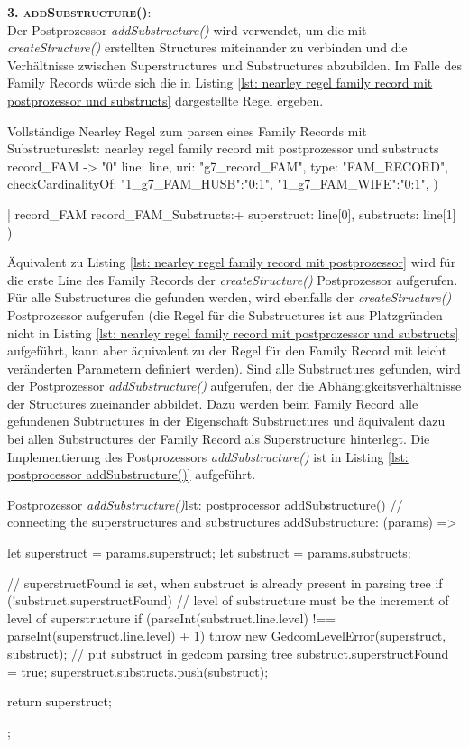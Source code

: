 \textsc{\textbf{3. addSubstructure()}:} \vspace{0.5em} \\
Der Postprozessor \textit{addSubstructure()} wird verwendet, um die mit \textit{createStructure()} erstellten Structures miteinander zu verbinden und die Verhältnisse zwischen Superstructures und Substructures abzubilden. Im Falle des Family Records würde sich die in Listing \ref{lst: nearley regel family record mit postprozessor und substructs} dargestellte Regel ergeben. 
\vspace{1em}
\begin{javascript}{Vollständige Nearley Regel zum parsen eines Family Records mit Substructures}{lst: nearley regel family record mit postprozessor und substructs}
	record_FAM
		-> "0"  %
			{%
					line: line,
					uri: "g7_record_FAM", 
					type: "FAM_RECORD", 
					checkCardinalityOf: {
						"1_g7_FAM_HUSB":"0:1", 
						"1_g7_FAM_WIFE":"0:1",
					}
				}) 
		
		|  record_FAM  record_FAM_Substructs:+
			{%
					superstruct: line[0], 
					substructs: line[1]
				})
\end{javascript}
\vspace{1em}
Äquivalent zu Listing \ref{lst: nearley regel family record mit postprozessor} wird für die erste Line des Family Records der \textit{createStructure()} Postprozessor aufgerufen. Für alle Substructures die gefunden werden, wird ebenfalls der \textit{createStructure()} Postprozessor aufgerufen (die Regel für die Substructures ist aus Platzgründen nicht in Listing \ref{lst: nearley regel family record mit postprozessor und substructs} aufgeführt, kann aber äquivalent zu der Regel für den Family Record mit leicht veränderten Parametern definiert werden). Sind alle Substructures gefunden, wird der Postprozessor \textit{addSubstructure()} aufgerufen, der die Abhängigkeitsverhältnisse der Structures zueinander abbildet. Dazu werden beim Family Record alle gefundenen Subtructures in der Eigenschaft Substructures und äquivalent dazu bei allen Substructures der Family Record als Superstructure hinterlegt. Die Implementierung des Postprozessors \textit{addSubstructure()} ist in Listing \ref{lst: postprocessor addSubstructure()} aufgeführt.
\vspace{1em}
\begin{javascript}{Postprozessor \textit{addSubstructure()}}{lst: postprocessor addSubstructure()}
	// connecting the superstructures and substructures
	addSubstructure: (params) => {
		let superstruct = params.superstruct;
		let substruct = params.substructs;
		
		// superstructFound is set, when substruct is already present in parsing tree
		if (!substruct.superstructFound) {
			// level of substructure must be the increment of level of superstructure
			if (parseInt(substruct.line.level) !== parseInt(superstruct.line.level) + 1) throw new GedcomLevelError(superstruct, substruct);
			// put substruct in gedcom parsing tree
			substruct.superstructFound = true;
			superstruct.substructs.push(substruct);
		}
		
		return superstruct;
	};
\end{javascript}
